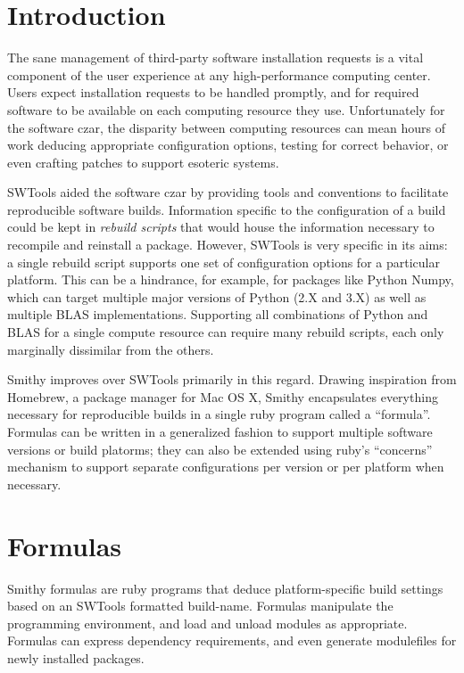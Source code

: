 \documentclass{acm_proc_article-sp}
\begin{document}


\section{Introduction}
The sane management of third-party software installation requests is a vital component of the user experience at any high-performance computing center. Users expect installation requests to be handled promptly, and for required software to be available on each computing resource they use. Unfortunately for the software czar, the disparity between computing resources can mean hours of work deducing appropriate configuration options, testing for correct behavior, or even crafting patches to support esoteric systems.

SWTools\cite{Fahey} aided the software czar by providing tools and conventions to facilitate reproducible software builds. Information specific to the configuration of a build could be kept in \textit{rebuild scripts} that would house the information necessary to recompile and reinstall a package. 
However, SWTools is very specific in its aims: a single rebuild script supports one set of configuration options for a particular platform. This can be a hindrance, for example, for packages like Python Numpy, which can target multiple major versions of Python (2.X and 3.X) as well as multiple BLAS implementations. Supporting all combinations of Python and BLAS for a single compute resource can require many rebuild scripts, each only marginally dissimilar from the others.

Smithy improves over SWTools primarily in this regard. Drawing inspiration from Homebrew\cite{Homebrew}, a package manager for Mac OS X, Smithy encapsulates everything necessary for reproducible builds in a single ruby program called a ``formula''. Formulas can be written in a generalized fashion to support multiple software versions or build platorms; they can also be extended using ruby's ``concerns'' mechanism to support separate configurations per version or per platform when necessary.

\section{Formulas}
Smithy formulas are ruby programs that deduce platform-specific build settings based on an SWTools formatted build-name. Formulas manipulate the programming environment, and load and unload modules as appropriate. Formulas can express dependency requirements, and even generate modulefiles for newly installed packages.
\end{document}
